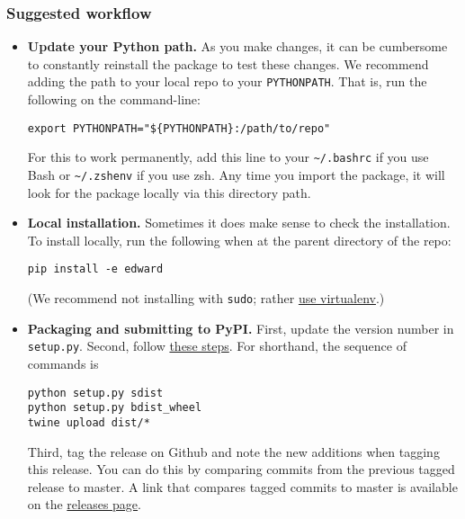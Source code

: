 \subsubsection{Suggested workflow}\label{suggested-workflow}

\begin{itemize}
\item
  \textbf{Update your Python path.} As you make changes, it can be
  cumbersome to constantly reinstall the package to test these changes.
  We recommend adding the path to your local repo to your
  \texttt{PYTHONPATH}. That is, run the following on the command-line:

\begin{lstlisting}[class=JSON]
export PYTHONPATH="${PYTHONPATH}:/path/to/repo"
\end{lstlisting}

  For this to work permanently, add this line to your
  \texttt{\textasciitilde{}/.bashrc} if you use Bash or
  \texttt{\textasciitilde{}/.zshenv} if you use zsh. Any time you import
  the package, it will look for the package locally via this directory
  path.
\item
  \textbf{Local installation.} Sometimes it does make sense to check the
  installation. To install locally, run the following when at the parent
  directory of the repo:

\begin{verbatim}
pip install -e edward
\end{verbatim}

  (We recommend not installing with \texttt{sudo}; rather
  \href{http://docs.python-guide.org/en/latest/starting/install/osx/}{use
  virtualenv}.)
\item
  \textbf{Packaging and submitting to PyPI.} First, update the version
  number in \texttt{setup.py}. Second, follow
  \href{https://packaging.python.org/en/latest/distributing/\#packaging-your-project}{these
  steps}. For shorthand, the sequence of commands is

\begin{lstlisting}[class=JSON]
python setup.py sdist
python setup.py bdist_wheel
twine upload dist/*
\end{lstlisting}

  Third, tag the release on Github and note the new additions when
  tagging this release. You can do this by comparing commits from the
  previous tagged release to master. A link that compares tagged commits
  to master is available on the
  \href{https://github.com/blei-lab/edward/releases}{releases page}.
\end{itemize}

